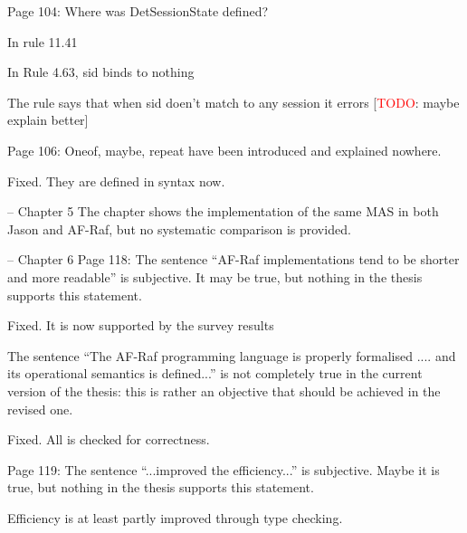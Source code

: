 \documentclass{article}
\newcommand{\todo}[1]{[\textcolor{red}{TODO}: #1]}
\newenvironment{them}{\noindent\begingroup\color{blue}}{\endgroup\par}
\begin{document}
\begin{them}

Page 104:
Where was DetSessionState defined?
\end{them}
In rule 11.41

\begin{them}

In Rule 4.63, sid binds to nothing
\end{them}
The rule says that when sid doen't match to any session it errors
\todo{maybe explain better}

\begin{them}

Page 106:
Oneof, maybe, repeat have been introduced and explained nowhere.
\end{them}
Fixed. They are defined in syntax now.

\begin{them}

-- Chapter 5
The chapter shows the implementation of the same MAS in both Jason and AF-Raf, but no systematic
comparison is provided.
\end{them}
\todo{}

\begin{them}

-- Chapter 6
Page 118:
The sentence “AF-Raf implementations tend to be shorter and more readable” is subjective. It may
be true, but nothing in the thesis supports this statement.
\end{them}
Fixed. It is now supported by the survey results

\begin{them}

The sentence “The AF-Raf programming language is properly formalised .... and its operational
semantics is defined...” is not completely true in the current version of the thesis: this is rather an
objective that should be achieved in the revised one.
\end{them}
Fixed. All is checked for correctness.

\begin{them}

Page 119:
The sentence “...improved the efficiency...” is subjective. Maybe it is true, but nothing in the thesis
supports this statement.
\end{them}
Efficiency is at least partly improved through type checking.
\end{document}

